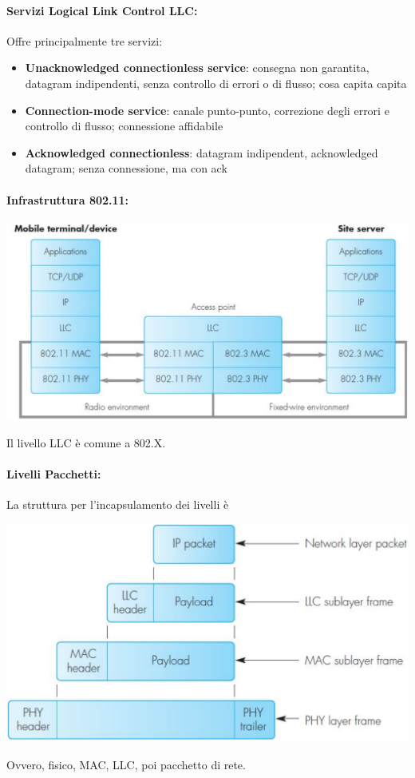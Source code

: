 \paragraph{Servizi Logical Link Control LLC:} Offre principalmente tre servizi: 
\begin{itemize}
	\item \textbf{Unacknowledged connectionless service}: consegna non garantita, datagram indipendenti, senza controllo di errori o di flusso; cosa capita capita

	\item \textbf{Connection-mode service}: canale punto-punto, correzione degli errori e controllo di flusso; connessione affidabile

	\item \textbf{Acknowledged connectionless}: datagram indipendent, acknowledged datagram; senza connessione, ma con ack
\end{itemize}

\paragraph{Infrastruttura 802.11:} 
\begin{center}
	\includegraphics[width=0.85\linewidth]{img/wlan/infr}
\end{center}
Il livello LLC è comune a 802.X.  

\paragraph{Livelli Pacchetti:} La struttura per l'incapsulamento dei livelli è 
\begin{center}
	\includegraphics[width=0.6\linewidth]{img/wlan/pacch1}
\end{center}
Ovvero, fisico, MAC, LLC, poi pacchetto di rete.

